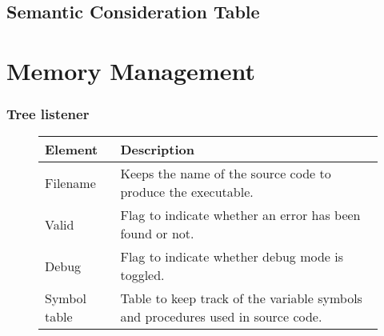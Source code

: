 \subsection{Semantic Consideration Table}

\section{Memory Management}
\subsubsection{Tree listener}
\begin{figure}[h]
    \centering
    \begin{tabular}{p{1in}p{3in}}
        \toprule
        \textbf{Element} & \textbf{Description}\\
        \midrule Filename &
        Keeps the name of the source code to produce the executable.\\

        \midrule Valid &
        Flag to indicate whether an error has been found or not.\\

        \midrule Debug &
        Flag to indicate whether debug mode is toggled.\\

        \midrule Symbol table &
        Table to keep track of the variable symbols and procedures used in
        source code.\\

        \bottomrule
    \end{tabular}\\
\end{figure}
